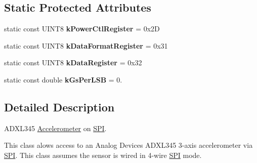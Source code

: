 \subsection*{\-Static \-Protected \-Attributes}
\begin{DoxyCompactItemize}
\item 
\hypertarget{classADXL345__SPI_a5df09125ebe5858dd8102a2eaa593339}{static const \-U\-I\-N\-T8 {\bfseries k\-Power\-Ctl\-Register} = 0x2\-D}\label{classADXL345__SPI_a5df09125ebe5858dd8102a2eaa593339}

\item 
\hypertarget{classADXL345__SPI_a676f2858d1e5bbcb6e15109fba7593e0}{static const \-U\-I\-N\-T8 {\bfseries k\-Data\-Format\-Register} = 0x31}\label{classADXL345__SPI_a676f2858d1e5bbcb6e15109fba7593e0}

\item 
\hypertarget{classADXL345__SPI_a4b2c02358b4e815ebfbf9eb3648e7bf0}{static const \-U\-I\-N\-T8 {\bfseries k\-Data\-Register} = 0x32}\label{classADXL345__SPI_a4b2c02358b4e815ebfbf9eb3648e7bf0}

\item 
\hypertarget{classADXL345__SPI_a37f1c9b4814445f56d8da431182165c5}{static const double {\bfseries k\-Gs\-Per\-L\-S\-B} = 0.}\label{classADXL345__SPI_a37f1c9b4814445f56d8da431182165c5}

\end{DoxyCompactItemize}


\subsection{\-Detailed \-Description}
\-A\-D\-X\-L345 \hyperlink{classAccelerometer}{\-Accelerometer} on \hyperlink{classSPI}{\-S\-P\-I}.

\-This class alows access to an \-Analog \-Devices \-A\-D\-X\-L345 3-\/axis accelerometer via \hyperlink{classSPI}{\-S\-P\-I}. \-This class assumes the sensor is wired in 4-\/wire \hyperlink{classSPI}{\-S\-P\-I} mode. 

